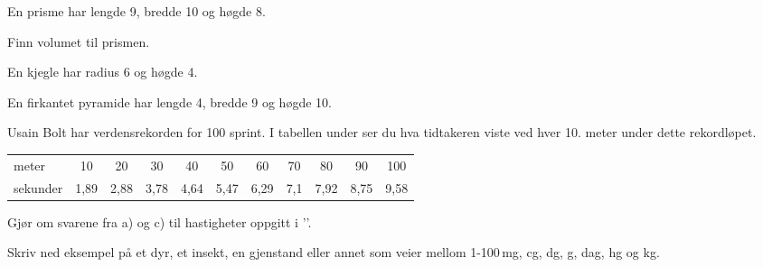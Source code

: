 \nes


En prisme har lengde 9, bredde 10 og høgde 8.\os

Finn volumet til prismen.


En kjegle har radius 6 og høgde 4.

En firkantet pyramide har lengde 4, bredde 9 og høgde 10.

\nes

Usain Bolt har verdensrekorden for 100 sprint. I tabellen under ser du hva tidtakeren viste ved hver 10. meter under dette rekordløpet. \vs
\begin{center}\small
	\begin{tabular}{l|c|c|c|c|c|c|c|c|c|c}
meter & 10 & 20 & 30 & 40 & 50 & 60 & 70 & 80 & 90 & 100\\
sekunder& 1,89 & 2,88 & 3,78 & 4,64 & 5,47 & 6,29 & 7,1 & 7,92 & 8,75 & 9,58
\end{tabular}
\end{center}
\newpage
\nes
{}
Gjør om svarene fra  a) og c) til hastigheter oppgitt i ''. 

Skriv ned eksempel på et dyr, et insekt, en gjenstand eller annet som veier mellom 1-100\,mg, cg, dg, g, dag, hg og kg.



